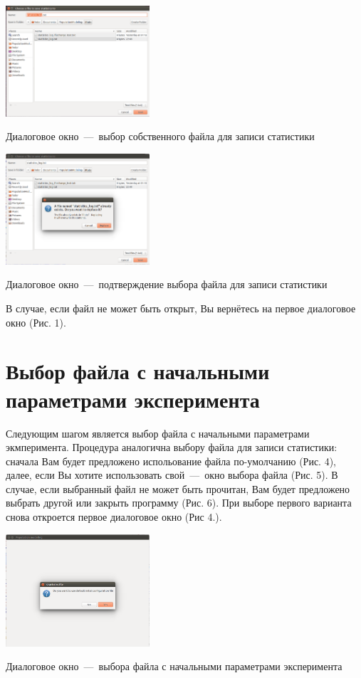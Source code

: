 \documentclass[11pt,twoside,twocolumn,russian,a4paper]{article}
\begin{document}
\begin{center}
\captionsetup{type=figure}
  	\includegraphics[width=0.4\textwidth]{help-scr2.png}
	\caption{Диалоговое окно~---~выбор собственного файла для записи статистики}
\end{center}

\begin{center}
\captionsetup{type=figure}
  	\includegraphics[width=0.4\textwidth]{help-scr3.png}
	\caption{Диалоговое окно~---~подтверждение выбора файла для записи статистики}
\end{center}

В случае, если файл не может быть открыт, Вы вернётесь на первое диалоговое окно (Рис. 1).

\section{\color{blue}Выбор файла с начальными параметрами эксперимента}

Следующим шагом является выбор файла с начальными параметрами экмперимента. Процедура аналогична выбору файла для записи статистики: сначала Вам будет предложено испольование файла по-умолчанию (Рис. 4), далее, если Вы хотите использовать свой~---~окно выбора файла (Рис. 5). В случае, если выбранный файл не может быть прочитан, Вам будет предложено выбрать другой или закрыть программу (Рис. 6). При выборе первого варианта снова откроется первое диалоговое окно (Рис 4.).

\begin{center}
\captionsetup{type=figure}
  \includegraphics[width=0.4\textwidth]{help-scr4.png}
	\caption{Диалоговое окно~---~выбора файла с начальными параметрами эксперимента}
\end{center}
\end{document}
